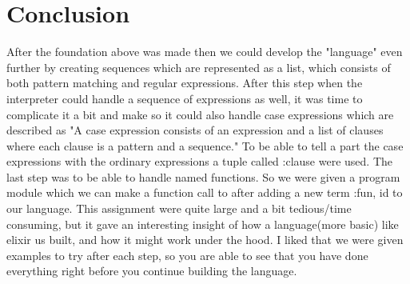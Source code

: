 \documentclass[a4paper,11pt]{article}
\begin{document}
\section{Conclusion}
After the foundation above was made then we could develop the "language" even further by creating sequences which are represented as a list, which consists of both pattern matching and regular expressions. After this step when the interpreter could handle a sequence of expressions as well, it was time to complicate it a bit and make so it could also handle case expressions which are described as "A case expression consists of an expression and a list of clauses where each clause is a pattern and a sequence." To be able to tell a part the case expressions with the ordinary expressions a tuple called :clause were used. The last step was to be able to handle named functions. So we were given a program module which we can make a function call to after adding a new term {:fun, id} to our language. This assignment were quite large and a bit tedious/time consuming, but it gave an interesting insight of how a language(more basic) like elixir us built, and how it might work under the hood. I liked that we were given examples to try after each step, so you are able to see that you have done everything right before you continue building the language.
\end{document}
